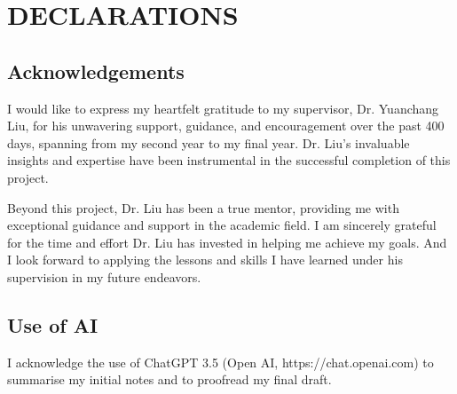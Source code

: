 \section{DECLARATIONS}
\label{sec:declarations}
\subsection{Acknowledgements}
I would like to express my heartfelt gratitude to my supervisor, Dr. Yuanchang Liu, 
for his unwavering support, guidance, and encouragement over the past 400 days, 
spanning from my second year to my final year. 
Dr. Liu's invaluable insights and expertise have been instrumental in the successful completion of this project.

Beyond this project, Dr. Liu has been a true mentor, 
providing me with exceptional guidance and support in the academic field. 
I am sincerely grateful for the time and effort Dr. Liu has invested in helping me achieve my goals. 
And I look forward to applying the lessons and skills I have learned under his supervision in my future endeavors.
\subsection{Use of AI}
I acknowledge the use of ChatGPT 3.5 (Open AI, https://chat.openai.com) to summarise my initial notes and to proofread my final draft.
